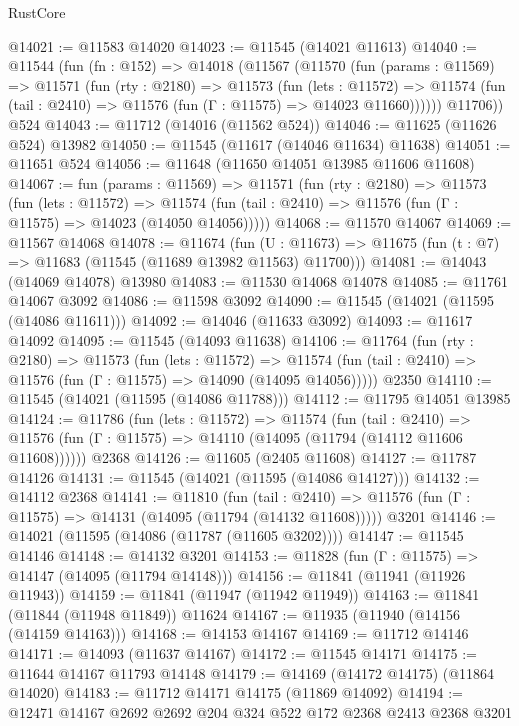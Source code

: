 \begin{lexlean}{RustCore}
\begin{coremodule}
@14021 := @11583 @14020
@14023 := @11545 (@14021 @11613)
@14040 := @11544
    (fun (fn : @152) =>
    @14018
      (@11567
        (@11570
          (fun (params : @11569) =>
          @11571
            (fun (rty : @2180) =>
            @11573
              (fun (lets : @11572) =>
              @11574 (fun (tail : @2410) => @11576 (fun (Γ : @11575) => @14023 @11660))))))
        @11706))
    @524
@14043 := @11712 (@14016 (@11562 @524))
@14046 := @11625 (@11626 @524) @13982
@14050 := @11545 (@11617 (@14046 @11634) @11638)
@14051 := @11651 @524
@14056 := @11648 (@11650 @14051 @13985 @11606 @11608)
@14067 := fun (params : @11569) =>
  @11571
    (fun (rty : @2180) =>
    @11573
      (fun (lets : @11572) =>
      @11574 (fun (tail : @2410) => @11576 (fun (Γ : @11575) => @14023 (@14050 @14056)))))
@14068 := @11570 @14067
@14069 := @11567 @14068
@14078 := @11674
    (fun (U : @11673) => @11675 (fun (t : @7) => @11683 (@11545 (@11689 @13982 @11563) @11700)))
@14081 := @14043 (@14069 @14078) @13980
@14083 := @11530 @14068 @14078
@14085 := @11761 @14067 @3092
@14086 := @11598 @3092
@14090 := @11545 (@14021 (@11595 (@14086 @11611)))
@14092 := @14046 (@11633 @3092)
@14093 := @11617 @14092
@14095 := @11545 (@14093 @11638)
@14106 := @11764
    (fun (rty : @2180) =>
    @11573
      (fun (lets : @11572) =>
      @11574 (fun (tail : @2410) => @11576 (fun (Γ : @11575) => @14090 (@14095 @14056)))))
    @2350
@14110 := @11545 (@14021 (@11595 (@14086 @11788)))
@14112 := @11795 @14051 @13985
@14124 := @11786
    (fun (lets : @11572) =>
    @11574
      (fun (tail : @2410) =>
      @11576 (fun (Γ : @11575) => @14110 (@14095 (@11794 (@14112 @11606 @11608))))))
    @2368
@14126 := @11605 (@2405 @11608)
@14127 := @11787 @14126
@14131 := @11545 (@14021 (@11595 (@14086 @14127)))
@14132 := @14112 @2368
@14141 := @11810
    (fun (tail : @2410) => @11576 (fun (Γ : @11575) => @14131 (@14095 (@11794 (@14132 @11608)))))
    @3201
@14146 := @14021 (@11595 (@14086 (@11787 (@11605 @3202))))
@14147 := @11545 @14146
@14148 := @14132 @3201
@14153 := @11828 (fun (Γ : @11575) => @14147 (@14095 (@11794 @14148)))
@14156 := @11841 (@11941 (@11926 @11943))
@14159 := @11841 (@11947 (@11942 @11949))
@14163 := @11841 (@11844 (@11948 @11849)) @11624
@14167 := @11935 (@11940 (@14156 (@14159 @14163)))
@14168 := @14153 @14167
@14169 := @11712 @14146
@14171 := @14093 (@11637 @14167)
@14172 := @11545 @14171
@14175 := @11644 @14167 @11793 @14148
@14179 := @14169 (@14172 @14175) (@11864 @14020)
@14183 := @11712 @14171 @14175 (@11869 @14092)
@14194 := @12471 @14167 @2692 @2692 @204 @324 @522 @172 @2368 @2413 @2368 @3201

\end{coremodule}
\end{lexlean}
